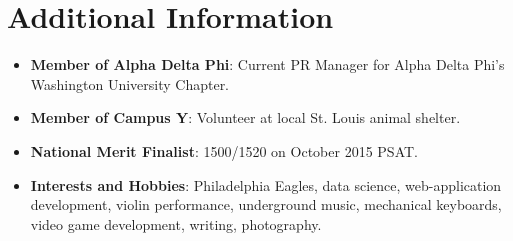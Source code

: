\documentclass[letterpaper,11pt]{article}
\newcommand{\resumeItem}[2]{
  \item\small{
    \textbf{#1}{: #2 \vspace{-2pt}}
  }
}
\newcommand{\resumeSubItem}[2]{\resumeItem{#1}{#2}\vspace{-4pt}}
\newcommand{\resumeSubHeadingListStart}{\begin{itemize}[leftmargin=*]}
\newcommand{\resumeSubHeadingListEnd}{\end{itemize}}
\begin{document}
\section{Additional Information}

	\resumeSubHeadingListStart
		\resumeSubItem{Member of Alpha Delta Phi}
		{Current PR Manager for Alpha Delta Phi's Washington University Chapter.}
		\resumeSubItem{Member of Campus Y}{Volunteer at local St. Louis animal shelter.}
		\resumeSubItem{National Merit Finalist}
		{1500/1520 on October 2015 PSAT.}
		\resumeSubItem{Interests and Hobbies}
		{Philadelphia Eagles, data science, web-application development, violin performance, underground music, mechanical keyboards, video game development,  writing, photography.}

	\resumeSubHeadingListEnd
	
\end{document}
